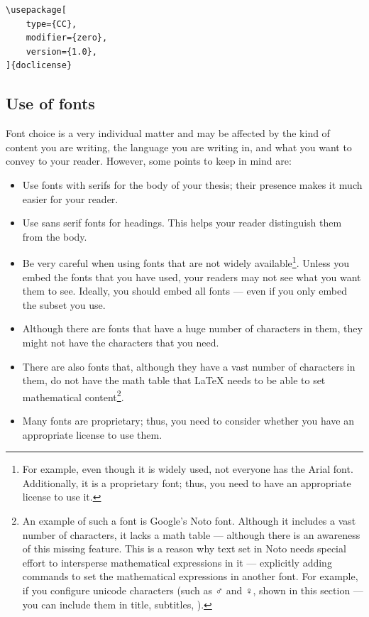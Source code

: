 \documentclass[12pt, twoside]{article}
\begin{document}
\begin{lstlisting}[style=latexExampleForAuthors]
\usepackage[
    type={CC},
    modifier={zero},
    version={1.0},
]{doclicense}
\end{lstlisting}

\subsection{Use of fonts}
\label{sec:cycle3useOfFonts}

Font choice is a very individual matter and may be affected by the kind of content you are writing, the language you are writing in, and what you want to convey to your reader. However, some points to keep in mind are:
\begin{itemize}
    \item Use fonts with serifs for the body of your thesis; their presence makes it much easier for your reader.

    \item Use sans serif fonts for headings. This helps your reader distinguish them from the body.

    \item Be very careful when using fonts that are not widely available\footnote{For example, even though it is widely used, not everyone has the Arial font. Additionally, it is a proprietary font; thus, you need to have an appropriate license to use it.}. Unless you embed the fonts that you have used, your readers may not see what you want them to see. Ideally, you should embed all fonts --- even if you only embed the subset you use.

    \item Although there are fonts that have a huge number of characters in them, they might not have the characters that you need.

    \item There are also fonts that, although they have a vast number of characters in them, do not have the math table that \LaTeX{} needs to be able to set mathematical content\footnote{An example of such a font is Google's Noto font. Although it includes a vast number of characters, it lacks a math table --- although there is an awareness of this missing feature. This is a reason why text set in Noto needs special effort to intersperse mathematical expressions in it --- \ie explicitly adding commands to set the mathematical expressions in another font. For example, if you configure unicode characters (such as {\mystixmathfont ♂} and {\mystixmathfont ♀}, shown in this section --- you can include them in title, subtitles, \etc).}.

    \item Many fonts are proprietary; thus, you need to consider whether you have an appropriate license to use them.
\end{itemize}
\end{document}
